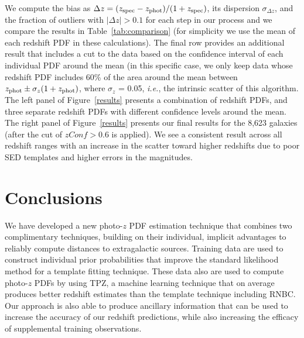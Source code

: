 We  compute the bias as $\Delta z = (z_{\rm spec}-z_{\rm phot})/(1+z_{\rm spec})$, its dispersion $\sigma_{\Delta z}$, and the fraction of outliers with $|\Delta z| > 0.1$ for each step in our process and we compare the results in Table~\ref{tab:comparison} (for simplicity we use the mean of each redshift PDF in these calculations). The final row provides an additional result that includes a cut to the data based on the confidence interval of each individual PDF around the mean (in this specific case, we only keep data whose redshift PDF includes 60\% of the area around the mean between $z_{\rm phot} \pm \sigma_{z}(1+z_{\rm phot})$, where $\sigma_z$ = 0.05, \textit{i.e.}, the intrinsic scatter of this algorithm. The left panel of Figure~\ref{results} presents a combination of redshift PDFs, and three separate redshift PDFs with different confidence levels around the mean. The right panel of Figure~\ref{results} presents our final results for the 8,623 galaxies (after the cut of $zConf > 0.6$ is applied). We see a consistent result across all redshift ranges with an increase in the scatter toward higher redshifts due to poor SED templates and higher errors in the magnitudes. 


\section{Conclusions}
We have developed a new photo-$z$ PDF estimation technique that combines two complimentary techniques, building on their individual, implicit advantages to reliably compute distances to extragalactic sources. Training data are used to construct individual prior probabilities that improve the standard likelihood method for a template fitting technique. These data also are used to compute photo-$z$ PDFs by using TPZ, a machine learning technique that on average produces better redshift estimates than the template technique including RNBC. Our approach is also able to produce ancillary information that can be used to increase the accuracy of our redshift predictions, while also increasing the efficacy of supplemental training observations.


	